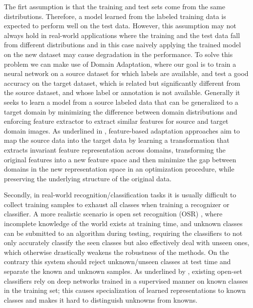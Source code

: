 \documentclass[10pt,twocolumn,letterpaper]{article}
\begin{document}
The firt assumption is that the training and test sets come from the same distributions.
Therefore, a model learned from the labeled training data is expected to perform well on the test data.
However, this assumption may not always hold in real-world applications where the training and the 
test data fall from different distributions and in this case naively applying the trained model on 
the new dataset may cause degradation in the performance. To solve this problem we can make use of 
Domain Adaptation, where our goal is to train a neural network on a source dataset for which labels 
are available, and test a good accuracy on the target dataset, which is related but
significantly different from the source dataset, and whose label or annotation is not available. 
Generally it seeks to learn a model from a source labeled data that can be generalized to a target domain
by minimizing the difference between domain distributions and enforcing feature extractor to extract 
similar features for source and target domain images.
As underlined in \cite{domainAdaptFarahani}, feature-based adaptation approaches aim to map the source data into the target data
by learning a transformation that extracts invariant feature representation across domains, transforming
the original features into a new feature space and then minimize the gap between domains in the new
representation space in an optimization procedure, while preserving the underlying structure of the
original data. 

Secondly, in real-world recognition/classification tasks it is usually difficult to collect 
training samples to exhaust all classes when training a recognizer or classifier.
A more realistic scenario is open set recognition (OSR) \cite{OSRsurvey}, where incomplete knowledge
of the world exists at training time, and unknown classes can be submitted to an algorithm
during testing, requiring the classifiers to not only accurately classify the seen classes
but also effectively deal with unseen ones, which otherwise drastically weakens the robustness
of the methods. On the contrary this system should reject unknown/unseen classes at test time and separate
the known and unknown samples.
As underlined by \cite{OSRclassRec}, existing open-set classifiers rely on deep networks trained in 
a supervised manner on known classes in the training set; this causes specialization of learned
representations to known classes and makes it hard to distinguish unknowns from knowns.
\end{document}
